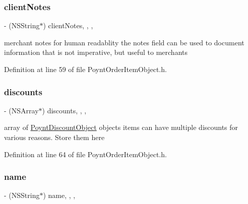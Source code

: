 \subsubsection{\texorpdfstring{client\+Notes}{clientNotes}}
{\footnotesize\ttfamily -\/ (N\+S\+String$\ast$) client\+Notes\hspace{0.3cm}{\ttfamily [read]}, {\ttfamily [write]}, {\ttfamily [nonatomic]}, {\ttfamily [copy]}}



merchant notes for human readablity  the notes field can be used to document information that is not imperative, but useful to merchants 



Definition at line 59 of file Poynt\+Order\+Item\+Object.\+h.

\hypertarget{interface_poynt_order_item_object_a203259381417b0a34916ce3f864161c2}{}\label{interface_poynt_order_item_object_a203259381417b0a34916ce3f864161c2} 
\subsubsection{\texorpdfstring{discounts}{discounts}}
{\footnotesize\ttfamily -\/ (N\+S\+Array$\ast$) discounts\hspace{0.3cm}{\ttfamily [read]}, {\ttfamily [write]}, {\ttfamily [nonatomic]}, {\ttfamily [strong]}}



array of \hyperlink{interface_poynt_discount_object}{Poynt\+Discount\+Object} objects  items can have multiple discounts for various reasons. Store them here 



Definition at line 64 of file Poynt\+Order\+Item\+Object.\+h.

\hypertarget{interface_poynt_order_item_object_a4b93d352d2fca75b34e1b5a50e03f587}{}\label{interface_poynt_order_item_object_a4b93d352d2fca75b34e1b5a50e03f587} 
\subsubsection{\texorpdfstring{name}{name}}
{\footnotesize\ttfamily -\/ (N\+S\+String$\ast$) name\hspace{0.3cm}{\ttfamily [read]}, {\ttfamily [write]}, {\ttfamily [nonatomic]}, {\ttfamily [copy]}}



